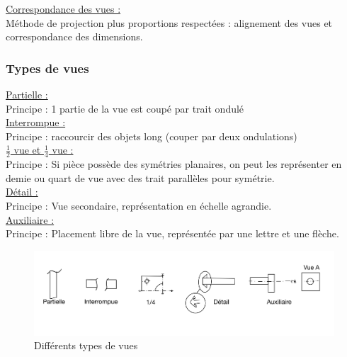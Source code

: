 \documentclass[../main.tex]{subfiles}
\begin{document}
\quad \underline{Correspondance des vues :}\\
Méthode de projection plus proportions respectées : alignement des vues et correspondance des dimensions.

\subsubsection{Types de vues}
\quad \underline{Partielle :}\\
Principe : 1 partie de la vue est coupé par trait ondulé\\

\quad \underline{Interrompue :}\\
Principe : raccourcir des objets long (couper par deux ondulations)\\

\quad \underline{$\frac{1}{2}$ vue et $\frac{1}{4}$ vue :}\\
Principe : Si pièce possède des symétries planaires, on peut les représenter en demie ou quart de vue avec des trait parallèles pour symétrie.\\

\quad \underline{Détail :}\\
Principe : Vue secondaire, représentation en échelle agrandie.\\

\quad \underline{Auxiliaire :}\\
Principe : Placement libre de la vue, représentée par une lettre et une flèche.\\

\begin{figure}[hbt!]
    \centering
    \includegraphics[width=\textwidth]{IMAGES/constru/vues.jpeg}
    \caption{Différents types de vues}
    
\end{figure}
\end{document}
